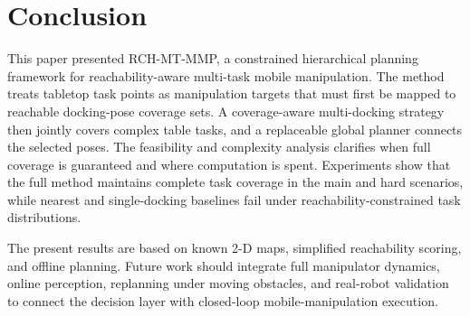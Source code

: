 \section{Conclusion}
\label{sec:conclusion}

This paper presented RCH-MT-MMP, a constrained hierarchical planning framework for reachability-aware multi-task mobile manipulation. The method treats tabletop task points as manipulation targets that must first be mapped to reachable docking-pose coverage sets. A coverage-aware multi-docking strategy then jointly covers complex table tasks, and a replaceable global planner connects the selected poses. The feasibility and complexity analysis clarifies when full coverage is guaranteed and where computation is spent. Experiments show that the full method maintains complete task coverage in the main and hard scenarios, while nearest and single-docking baselines fail under reachability-constrained task distributions.

The present results are based on known 2-D maps, simplified reachability scoring, and offline planning. Future work should integrate full manipulator dynamics, online perception, replanning under moving obstacles, and real-robot validation to connect the decision layer with closed-loop mobile-manipulation execution.
